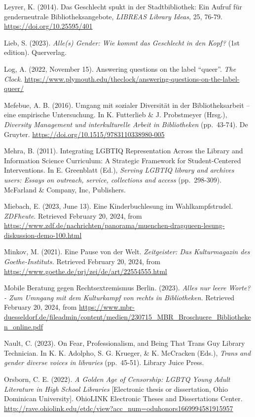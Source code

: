 \documentclass[a4paper,
fontsize=11pt,
oneside,
numbers=noperiodatend,
parskip=half-,
bibliography=totoc,
final
]{scrartcl}
\begin{document}
Leyrer, K. (2014). Das Geschlecht spukt in der Stadtbibliothek: Ein
Aufruf für genderneutrale Bibliotheksangebote, \emph{LIBREAS Library
Ideas,} 25, 76-79. \url{https://doi.org/10.25595/401}

Lieb, S. (2023). \emph{Alle(s) Gender: Wie kommt das Geschlecht in den
Kopf?} (1st edition). Querverlag.

Log, A. (2022, November 15). Answering questions on the label \enquote{queer}.
\emph{The Clock}.
\url{https://www.plymouth.edu/theclock/answering-questions-on-the-label-queer/}

Mefebue, A. B. (2016). Umgang mit sozialer Diversität in der
Bibliotheksarbeit -- eine empirische Untersuchung. In K. Futterlieb \&
J. Probstmeyer (Hrsg.), \emph{Diversity Management und interkulturelle
Arbeit in Bibliotheken} (pp.~43-74). De Gruyter.
\url{https://doi.org/10.1515/9783110338980-005}

Mehra, B. (2011). Integrating LGBTIQ Representation Across the Library
and Information Science Curriculum: A Strategic Framework for
Student-Centered Interventions. In E. Greenblatt (Ed.), \emph{Serving
LGBTIQ library and archives users: Essays on outreach, service,
collections and access} (pp.~298-309). McFarland \& Company, Inc,
Publishers.

Miebach, E. (2023, June 13). Eine Kinderbuchlesung im Wahlkampfstrudel.
\emph{ZDFheute}. Retrieved February 20, 2024, from
\url{https://www.zdf.de/nachrichten/panorama/muenchen-dragqueen-lesung-diskussion-demo-100.html}

Minkov, M. (2021). Eine Pause von der Welt. \emph{Zeitgeister: Das
Kulturmagazin des Goethe-Instituts.} Retrieved February 20, 2024, from
\url{https://www.goethe.de/prj/zei/de/art/22554555.html}

Mobile Beratung gegen Rechtsextremismus Berlin. (2023). \emph{Alles nur
leere Worte? - Zum Umngang mit dem Kulturkampf von rechts in
Bibliotheken.} Retrieved February 20, 2024, from
\url{https://www.mbr-duesseldorf.de/fileadmin/content/medien/230715_MBR_Broschuere_Bibliotheken_online.pdf}

Nault, C. (2023). On Fear, Professionalism, and Being That Trans Guy
Library Technician. In K. K. Adolpho, S. G. Krueger, \& K. McCracken
(Eds.), \emph{Trans and gender diverse voices in libraries} (pp.~45-51).
Library Juice Press.

Orsborn, C. E. (2022). \emph{A Golden Age of Censorship: LGBTQ Young
Adult Literature in High School Libraries} {[}Electronic thesis or
dissertation, Ohio Dominican University{]}. OhioLINK Electronic Theses
and Dissertations Center.
\url{http://rave.ohiolink.edu/etdc/view?acc_num=oduhonors1669994581915957}
\end{document}
